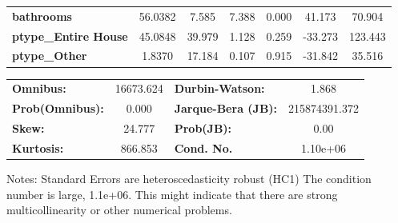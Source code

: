 \begin{center}
\begin{tabular}{lcccccc}
\textbf{bathrooms}              &      56.0382  &        7.585     &     7.388  &         0.000        &       41.173    &       70.904     \\
\textbf{ptype\_Entire House}    &      45.0848  &       39.979     &     1.128  &         0.259        &      -33.273    &      123.443     \\
\textbf{ptype\_Other}           &       1.8370  &       17.184     &     0.107  &         0.915        &      -31.842    &       35.516     \\
\bottomrule
\end{tabular}
\begin{tabular}{lclc}
\textbf{Omnibus:}       & 16673.624 & \textbf{  Durbin-Watson:     } &       1.868    \\
\textbf{Prob(Omnibus):} &    0.000  & \textbf{  Jarque-Bera (JB):  } & 215874391.372  \\
\textbf{Skew:}          &   24.777  & \textbf{  Prob(JB):          } &        0.00    \\
\textbf{Kurtosis:}      &  866.853  & \textbf{  Cond. No.          } &    1.10e+06    \\
\bottomrule
\end{tabular}
\end{center}

Notes: \newline
 [1] Standard Errors are heteroscedasticity robust (HC1) \newline
 [2] The condition number is large, 1.1e+06. This might indicate that there are \newline
 strong multicollinearity or other numerical problems.